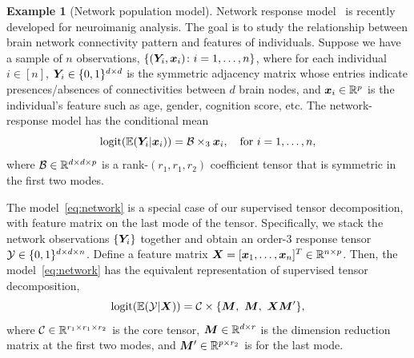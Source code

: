 \documentclass[10pt]{article}
\theoremstyle{definition}
\theoremstyle{definition}
\newtheorem{example}{Example}
\theoremstyle{definition}
\begin{document}
\begin{enumerate}
\begin{example}[Network population model]\label{example:brain}
Network response model~\cite{rabusseau2016low, zhang2018network} is recently developed for neuroimanig analysis. The goal is to study the relationship between brain network connectivity pattern and features of individuals. Suppose we have a sample of $n$ observations, $\{(\bm Y_i, \bm x_i)\colon i=1,\ldots,n\}$, where for each individual $i\in[n]$, $\bm Y_i\in\{0,1\}^{d\times d}$ is the symmetric adjacency matrix whose entries indicate presences/absences of connectivities between $d$ brain nodes, and $\bm x_i\in\mathbb{R}^p$ is the individual's feature such as age, gender, cognition score, etc. The network-response model  has the conditional mean
\begin{equation}\label{eq:network}
\textup{logit}(\mathbb{E}(\bm Y_i|\bm x_i))=\mathcal{B}\times_3\bm x_i, \quad \text{for }i=1,\ldots,n,
\end{equation}
where $\mathcal{B}\in \mathbb{R}^{d\times d\times p}$ is a rank-$(r_1,r_1,r_2)$ coefficient tensor that is symmetric in the first two modes.  

The model~\eqref{eq:network} is a special case of our supervised tensor decomposition, with feature matrix on the last mode of the tensor. Specifically, we stack the network observations $\{\bm Y_i\}$ together and obtain an order-3 response tensor $\mathcal{Y}\in\{0,1\}^{d\times d\times n}$. Define a feature matrix $\bm X=[\bm x_1,\ldots,\bm x_n]^T\in\mathbb{R}^{n\times p}$. Then, the model~\eqref{eq:network} has the equivalent representation of supervised tensor decomposition,
\[
\textup{logit}(\mathbb{E}(\tY|\mX))=\tC\times\{\mM,\ \mM,\ \mX\mM'\},
\]
where $\mathcal{C}\in\mathbb{R}^{r_1\times r_1\times r_2}$ is the core tensor, $\bm M\in\mathbb{R}^{d\times r}$ is the dimension reduction matrix at the first two modes, and $\bm M'\in\mathbb{R}^{p\times r_2}$ is for the last mode.\\
 \end{example}
 

\end{enumerate}
\end{document}
